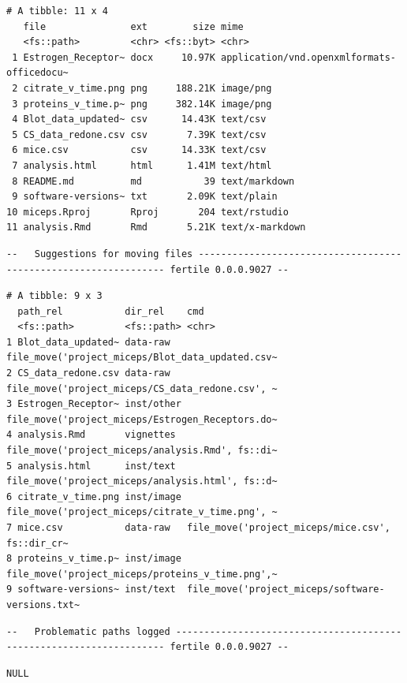 \documentclass[12pt,twoside]{reedthesis}
\begin{document}
\begin{verbatim}
# A tibble: 11 x 4
   file               ext        size mime                                      
   <fs::path>         <chr> <fs::byt> <chr>                                     
 1 Estrogen_Receptor~ docx     10.97K application/vnd.openxmlformats-officedocu~
 2 citrate_v_time.png png     188.21K image/png                                 
 3 proteins_v_time.p~ png     382.14K image/png                                 
 4 Blot_data_updated~ csv      14.43K text/csv                                  
 5 CS_data_redone.csv csv       7.39K text/csv                                  
 6 mice.csv           csv      14.33K text/csv                                  
 7 analysis.html      html      1.41M text/html                                 
 8 README.md          md           39 text/markdown                             
 9 software-versions~ txt       2.09K text/plain                                
10 miceps.Rproj       Rproj       204 text/rstudio                              
11 analysis.Rmd       Rmd       5.21K text/x-markdown                           
\end{verbatim}
\begin{verbatim}
--   Suggestions for moving files ---------------------------------------------------------------- fertile 0.0.0.9027 --
\end{verbatim}
\begin{verbatim}
# A tibble: 9 x 3
  path_rel           dir_rel    cmd                                             
  <fs::path>         <fs::path> <chr>                                           
1 Blot_data_updated~ data-raw   file_move('project_miceps/Blot_data_updated.csv~
2 CS_data_redone.csv data-raw   file_move('project_miceps/CS_data_redone.csv', ~
3 Estrogen_Receptor~ inst/other file_move('project_miceps/Estrogen_Receptors.do~
4 analysis.Rmd       vignettes  file_move('project_miceps/analysis.Rmd', fs::di~
5 analysis.html      inst/text  file_move('project_miceps/analysis.html', fs::d~
6 citrate_v_time.png inst/image file_move('project_miceps/citrate_v_time.png', ~
7 mice.csv           data-raw   file_move('project_miceps/mice.csv', fs::dir_cr~
8 proteins_v_time.p~ inst/image file_move('project_miceps/proteins_v_time.png',~
9 software-versions~ inst/text  file_move('project_miceps/software-versions.txt~
\end{verbatim}
\begin{verbatim}
--   Problematic paths logged -------------------------------------------------------------------- fertile 0.0.0.9027 --
\end{verbatim}
\begin{verbatim}
NULL
\end{verbatim}
\normalsize
\end{document}
